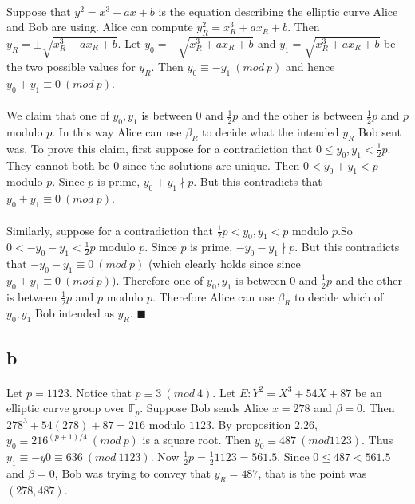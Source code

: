 \documentclass[letterpaper,12pt,oneside,onecolumn]{report}
\begin{document}
\paragraph{}
Suppose that $y^2 = x^3 + ax + b$ is the equation describing the elliptic curve Alice and Bob are using. Alice can compute $y_R^2 = x_R^3 + ax_R + b$. Then $y_R = \pm \sqrt{x_R^3 + ax_R + b}$. Let $y_0 = -\sqrt{x_R^3 + ax_R + b}$ and $y_1 = \sqrt{x_R^3 + ax_R + b}$ be the two possible values for $y_R$. Then $y_0 \equiv -y_1\ (mod\ p)$ and hence $y_0 + y_1 \equiv 0\ (mod\ p)$.
\paragraph{}
We claim that one of $y_0,y_1$ is between $0$ and $\frac{1}{2}p$ and the other is between $\frac{1}{2}p$ and $p$ modulo $p$. In this way Alice can use $\beta_R$ to decide what the intended $y_R$ Bob sent was. To prove this claim, first suppose for a contradiction that $0 \leq y_0,y_1 < \frac{1}{2}p$. They cannot both be $0$ since the solutions are unique. Then $0 < y_0 + y_1 < p$ modulo $p$. Since $p$ is prime, $y_0 + y_1 \nmid p$. But this contradicts that $y_0 + y_1 \equiv 0\ (mod\ p)$.
\paragraph{}
Similarly, suppose for a contradiction that $\frac{1}{2}p < y_0,y_1 < p$ modulo $p$.So  $0 < -y_0 -y_1 < \frac{1}{2}p$ modulo $p$. Since $p$ is prime, $-y_0 - y_1 \nmid p$. But this contradicts that $-y_0 -y_1 \equiv 0\ (mod\ p)$ (which clearly holds since since $y_0 + y_1 \equiv 0\ (mod\ p)$). Therefore one of $y_0,y_1$ is between $0$ and $\frac{1}{2}p$ and the other is between $\frac{1}{2}p$ and $p$ modulo $p$. Therefore Alice can use $\beta_R$ to decide which of $y_0,y_1$ Bob intended as $y_R$. $\blacksquare$
\subsection*{b}
\paragraph{}
Let $p = 1123$. Notice that $p \equiv 3\ (mod\ 4)$. Let $E: Y^2 = X^3 + 54X + 87$ be an elliptic curve group over $\mathbb{F}_p$. Suppose Bob sends Alice $x=278$ and $\beta = 0$. Then $278^3 + 54(278) + 87 = 216$ modulo $1123$. By proposition $2.26$, $y_0 \equiv 216^{(p+1)/4}\ (mod\ p)$ is a square root. Then $y_0 \equiv 487\ (mod 1123)$. Thus $y_1 \equiv -y0 \equiv 636\ (mod\ 1123)$. Now $\frac{1}{2}p = \frac{1}{2}1123 = 561.5$. Since $0 \leq 487 < 561.5$ and $\beta = 0$, Bob was trying to convey that $y_R = 487$, that is the point was $(278, 487)$.
\end{document}
